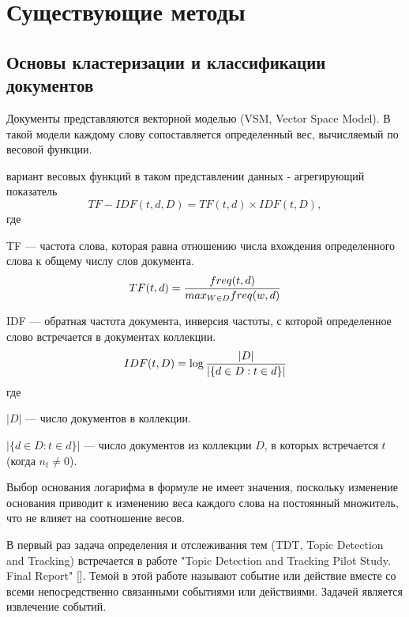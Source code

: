 \section{Существующие методы}
\subsection{Основы кластеризации и классификации документов}



Документы представляются векторной моделью (VSM, Vector Space Model). В такой модели каждому слову сопоставляется определенный вес, вычисляемый по весовой функции.

 вариант весовых функций в таком представлении данных - агрегирующий показатель
$$
TF-IDF(t,d,D)=TF(t,d) \times IDF(t,D),
$$
где

TF — частота слова, которая равна отношению числа вхождения определенного слова к общему числу слов документа.
$$
TF(t,d)={{freq(t,d)}\over{max_{W \in D} freq(w,d)}}
$$

IDF — обратная частота документа, инверсия частоты, с которой определенное слово встречается в документах коллекции.
$$
IDF(t,D)=\log{{|D|}\over{|\{ d \in D:t \in d \}|}}
$$
где

$|D|$ — число документов в коллекции.

$|\{ d \in D:t \in d \}|$ — число документов из коллекции  $D$, в которых встречается  $t$ (когда $n_t \neq 0$).

Выбор основания логарифма в формуле не имеет значения, поскольку изменение основания приводит к изменению веса каждого слова на постоянный множитель, что не влияет на соотношение весов.


В первый раз задача определения и отслеживания тем (TDT, Topic Detection and Tracking) встречается в работе 
"Topic Detection and Tracking Pilot Study. Final Report" [\todo{}]. Темой в этой работе называют событие или действие вместе со всеми непосредственно связанными событиями или действиями. Задачей является извлечение событий.

